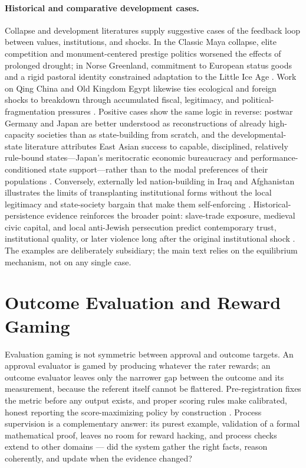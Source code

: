 \documentclass{article}
\theoremstyle{plain}
\theoremstyle{definition}
\theoremstyle{remark}
\begin{document}
\paragraph{Historical and comparative development cases.}
Collapse and development literatures supply suggestive cases of the feedback loop between values, institutions, and shocks. In the Classic Maya collapse, elite competition and monument-centered prestige politics worsened the effects of prolonged drought; in Norse Greenland, commitment to European status goods and a rigid pastoral identity constrained adaptation to the Little Ice Age \citep{demarest2004ancient, dugmore2012cultural, mcgovern2014management}. Work on Qing China and Old Kingdom Egypt likewise ties ecological and foreign shocks to breakdown through accumulated fiscal, legitimacy, and political-fragmentation pressures \citep{goldstone2017demographic, orlandi2023qing, hassen1997nile}. Positive cases show the same logic in reverse: postwar Germany and Japan are better understood as reconstructions of already high-capacity societies than as state-building from scratch, and the developmental-state literature attributes East Asian success to capable, disciplined, relatively rule-bound states---Japan's meritocratic economic bureaucracy and performance-conditioned state support---rather than to the modal preferences of their populations \citep{johnson1982miti, amsden1989asia, haggard1990pathways, wade2018developmental}. Conversely, externally led nation-building in Iraq and Afghanistan illustrates the limits of transplanting institutional forms without the local legitimacy and state-society bargain that make them self-enforcing \citep{andrews2017statecapability, donais2009empowerment, bohnke2017state}. Historical-persistence evidence reinforces the broader point: slave-trade exposure, medieval civic capital, and local anti-Jewish persecution predict contemporary trust, institutional quality, or later violence long after the original institutional shock \citep{nunnwantchekon2011, guiso2016long, nunn2009importance, voigtlaender2012persecution}. The examples are deliberately subsidiary; the main text relies on the equilibrium mechanism, not on any single case.

\section{Outcome Evaluation and Reward Gaming}
\label{app:gaming}
Evaluation gaming is not symmetric between approval and outcome targets. An approval evaluator is gamed by producing whatever the rater rewards; an outcome evaluator leaves only the narrower gap between the outcome and its measurement, because the referent itself cannot be flattered. Pre-registration fixes the metric before any output exists, and proper scoring rules make calibrated, honest reporting the score-maximizing policy by construction \citep{gneiting2007strictly}. Process supervision \citep{uesato2022solving, lightman2023verify} is a complementary answer: its purest example, validation of a formal mathematical proof, leaves no room for reward hacking, and process checks extend to other domains --- did the system gather the right facts, reason coherently, and update when the evidence changed?
\end{document}
